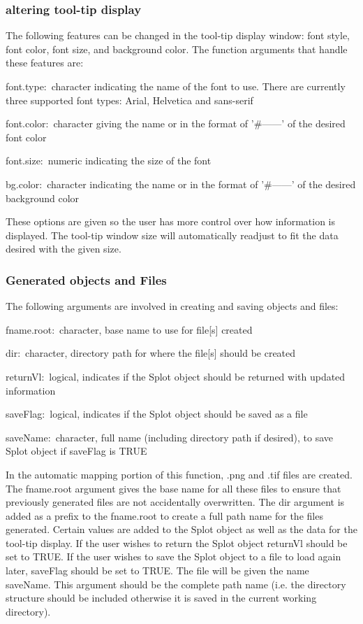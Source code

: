 \documentclass[]{article}
\begin{document}
\subsubsection{altering tool-tip display}
\indent The following features can be changed in the tool-tip display window:  font style, font color, font size, and background color. The function arguments that handle these features are:
 
\begin{description}
\item{font.type:~}{character indicating the name of the font to use. There are currently three supported font types: Arial, Helvetica and sans-serif}
\item{font.color:~}{character giving the name or in the format of '\#------' of the desired font color}
\item{font.size:~}{numeric indicating the size of the font }
\item{bg.color:~}{character indicating the name or in the format of '\#------' of the desired background color}
\end{description}

These options are given so the user has more control over how information is displayed. The tool-tip window size will automatically readjust to fit the data desired with the given size.

\subsubsection{Generated objects and Files}

The following arguments are involved in creating and saving objects and files:
\begin{description}
\item{fname.root:~}{character, base name to use for file[s] created}
\item{dir:~}{character, directory path for where the file[s] should be created}
\item{returnVl:~}{logical, indicates if the Splot object should be returned with updated information}
\item{saveFlag:~}{logical, indicates if the Splot object should be saved as a file}
\item{saveName:~}{character, full name (including directory path if desired), to save Splot object if saveFlag is TRUE}
\end{description}

\indent In the automatic mapping portion of this function, .png and .tif files are created. The fname.root argument gives the base name for all these files to ensure that previously generated files are not accidentally overwritten. The dir argument is added as a prefix to the fname.root to create a full path name for the files generated. Certain values are added to the Splot object as well as the data for the tool-tip display. If the user wishes to return the Splot object returnVl should be set to TRUE. If the user wishes to save the Splot object to a file to load again later, saveFlag should be set to TRUE. The file will be given the name saveName. This argument should be the complete path name (i.e. the directory structure should be included otherwise it is saved in the current working directory). 
\end{document}
